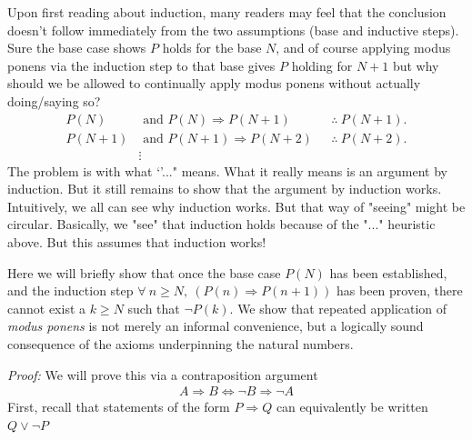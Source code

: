 Upon first reading about induction, many readers may feel that the conclusion doesn't 
follow immediately from the two assumptions (base and inductive steps). Sure the base
case shows $P$ holds for the base $N$, and of course applying modus ponens via the 
induction step to that  base gives $P$ holding for $N+1$ but why should we be allowed to 
continually apply modus ponens without actually doing/saying so?
\begin{align*} 
    P(N) &\text{ and }  P(N)\Rightarrow P(N+1) \ \ \ &\therefore \ P(N+1). \\
    P(N+1) &\text{ and }  P(N+1)\Rightarrow P(N+2) \ \ \ &\therefore \ P(N+2). \\
    &\vdots
\end{align*}
The problem is with what `'..." means. What it really means is an argument by induction. 
But it still remains to show that the argument by induction works. Intuitively, 
we all can see why induction works. But that way of "seeing" might be circular. 
Basically, we "see" that induction holds because of the "..." heuristic above. 
But this assumes that induction works!

Here we will briefly show that once the base case
$P(N)$ has been established, and the induction step 
$\forall \ n \ge N, \  (P(n) \Rightarrow P(n+1))$ has been proven, 
there cannot exist a $k \ge N$ such that $\lnot P(k)$.
We show that repeated application of \textit{modus ponens} is not merely an
informal convenience, but a logically sound consequence of the axioms
underpinning the natural numbers.

\noindent \textit{Proof:} We will prove this via a contraposition argument 
\begin{align*}
    A\Rightarrow B \iff \lnot B \Rightarrow \lnot A
\end{align*}
First, recall that statements of the form $P\Rightarrow Q$ can equivalently be written $Q\lor \lnot P$

